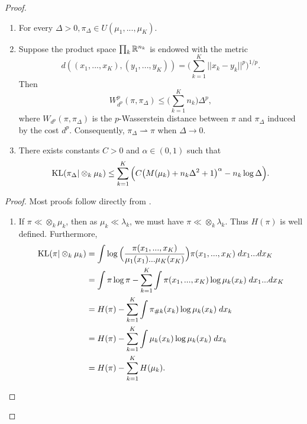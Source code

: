 \begin{proof}
\begin{lemma}
\begin{enumerate}
        \item For every $\Delta > 0, \pi_{\Delta} \in U(\mu_1, ..., \mu_K)$.

        \item Suppose the product space $\prod_k \mathbb R^{n_k}$ is endowed with the metric
        \begin{equation}
          d((x_1, ..., x_K), (y_1, ..., y_K)) = \Big( \sum_{k=1}^K \vert\vert x_k - y_k \vert\vert^p \Big)^{1/p}.
        \end{equation}
        Then
        \begin{equation}
          W^p_{d^p}(\pi, \pi_{\Delta}) \leq \Big( \sum_{k=1}^K n_k \Big) \Delta^p,
        \end{equation}
        where $W_{d^p}(\pi, \pi_{\Delta})$ is the $p$-Wasserstein distance between $\pi$ and $\pi_{\Delta}$ induced by the cost $d^p$.
        Consequently, $\pi_{\Delta} \rightharpoonup \pi$ when $\Delta \to 0$.

        \item There exists constants $C > 0$ and $\alpha \in (0,1)$ such that
        \begin{equation}
          \text{KL}(\pi_{\Delta} \vert \otimes_k \mu_k) \leq
          \sum_{k=1}^K \Big( C \big( M(\mu_k) + n_k \Delta^2 + 1 \big)^{\alpha} - n_k \log \Delta \Big).
        \end{equation}
      \end{enumerate}
    \end{lemma}
    \begin{proof}
      Most proofs follow directly from \citep{Carlier17}.
      \begin{enumerate}
        \item If $\pi \ll \otimes_k \mu_k$, then as $\mu_k \ll \lambda_k$, we must have $\pi \ll \otimes_k \lambda_k$. Thus $H(\pi)$ is well
        defined. Furthermore,
        \begin{equation}
          \begin{split}
            \text{KL}(\pi \vert \otimes_k \mu_k)
            &= \int \log \Big( \frac{\pi(x_1,...,x_K)}{\mu_1(x_1)...\mu_K(x_K)} \Big) \pi(x_1, ..., x_K) \; dx_1 ... dx_K \\
            &= \int \pi \log \pi - \sum_{k=1}^K \int \pi(x_1, ..., x_K) \log \mu_k(x_k) \; dx_1 ... dx_K \\
            &= H(\pi) - \sum_{k=1}^K \int \pi_{\# k}(x_k) \log \mu_k(x_k) \; dx_k \\
            &= H(\pi) - \sum_{k=1}^K \int \mu_k(x_k) \log \mu_k(x_k) \; dx_k \\
            &= H(\pi) - \sum_{k=1}^K H(\mu_k).
          \end{split}
        \end{equation}


\end{enumerate}
\end{proof}
\end{proof}
